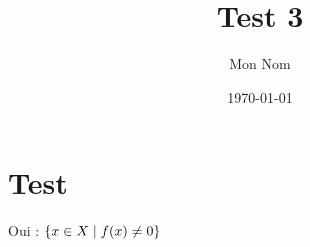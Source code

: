 \documentclass{scrartcl}
\title{Test 3}
\author{Mon Nom}
\date{\today}
\begin{document}
    \section{Test}
        Oui : $\set[f(x) \neq 0]{x \in X}$
\end{document}
